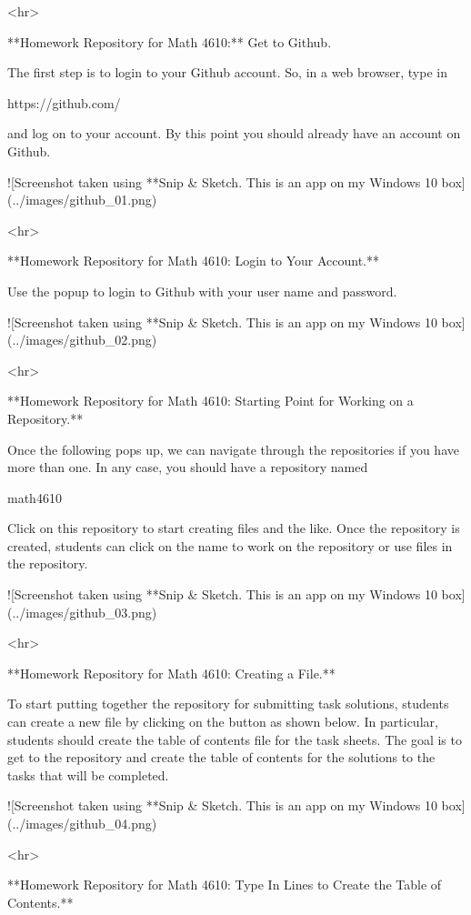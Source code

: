 <hr>

**Homework Repository for Math 4610:** Get to Github. 

The first step is to login to your Github account. So, in a web browser, type in

     https://github.com/

and log on to your account. By this point you should already have an account on
Github.

![Screenshot taken using **Snip & Sketch. This is an app on my Windows 10 box](../images/github_01.png)

<hr>

**Homework Repository for Math 4610: Login to Your Account.** 

Use the popup to login to Github with your user name and password.

![Screenshot taken using **Snip & Sketch. This is an app on my Windows 10 box](../images/github_02.png)

<hr>

**Homework Repository for Math 4610: Starting Point for Working on a Repository.** 

Once the following pops up, we can navigate through the repositories if you
have more than one. In any case, you should have a repository named

     math4610

Click on this repository to start creating files and the like. Once the
repository is created, students can click on the name to work on the repository
or use files in the repository.

![Screenshot taken using **Snip & Sketch. This is an app on my Windows 10 box](../images/github_03.png)

<hr>

**Homework Repository for Math 4610: Creating a File.** 

To start putting together the repository for submitting task solutions, students
can create a new file by clicking on the button as shown below. In particular,
students should create the table of contents file for the task sheets. The goal
is to get to the repository and create the table of contents for the solutions
to the tasks that will be completed.

![Screenshot taken using **Snip & Sketch. This is an app on my Windows 10 box](../images/github_04.png)

<hr>

**Homework Repository for Math 4610: Type In Lines to Create the Table of Contents.**

